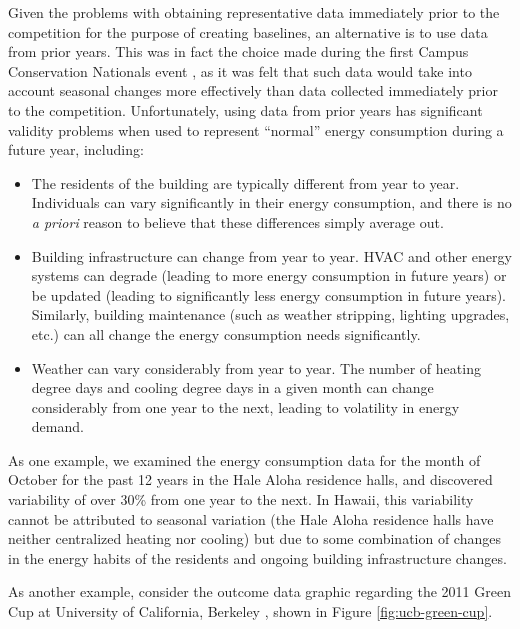 \documentclass[jou]{apa} %
\begin{document}
Given the problems with obtaining representative data immediately prior to the competition
for the purpose of creating baselines, an alternative is to use data from prior years.
This was in fact the choice made during the first Campus Conservation Nationals event
\cite{Willens2010}, as it was felt that such data would take into account seasonal changes
more effectively than data collected immediately prior to the competition. Unfortunately,
using data from prior years has significant validity problems when used to represent
``normal'' energy consumption during a future year, including:

\begin{itemize}

\item The residents of the building are typically different from year to year.
  Individuals can vary significantly in their energy consumption, and there is no {\em a
    priori} reason to believe that these differences simply average out. 

\item Building infrastructure can change from year to year. HVAC and other energy systems
  can degrade (leading to more energy consumption in future years) or be updated (leading
  to significantly less energy consumption in future years).  Similarly, building
  maintenance (such as weather stripping, lighting upgrades, etc.) can all change the
  energy consumption needs significantly.

\item Weather can vary considerably from year to year.  The number of heating degree days and cooling
  degree days in a given month can change considerably from one year to the next, leading
  to volatility in energy demand. 

\end{itemize}

As one example, we examined the energy consumption data for the month of October for the
past 12 years in the Hale Aloha residence halls, and discovered variability of over 30\%
from one year to the next. In Hawaii, this variability cannot be attributed to seasonal
variation (the Hale Aloha residence halls have neither centralized heating nor cooling)
but due to some combination of changes in the energy habits of the residents and ongoing
building infrastructure changes.

As another example, consider the outcome data graphic regarding the 2011 Green Cup at University of
California, Berkeley \cite{Dhong2011}, shown in Figure \ref{fig:ucb-green-cup}.
\end{document}

